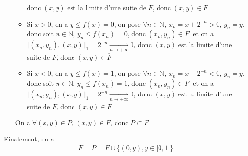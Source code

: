 \documentclass[a4paper,12pt]{book}
\begin{document}
\begin{itemize}
\begin{itemize}
        donc $(x,y)$ est la limite d'une suite de $F$, donc $(x,y) \in \overline{F}$
        \item Si $x>0$, on a $y \leq f(x)=0$, on pose $\forall n \in \mathbb{N}$, $x_n=x+2^{-n}>0$, $y_n=y$, donc soit $n \in \mathbb{N}$, $y_n \leq f(x_n)=0$, donc $(x_n,y_n) \in F$, et on a $\Vert(x_n,y_n),(x,y)\Vert_1=2^{-n}\xrightarrow[n \to +\infty]{}0$, 
        donc $(x,y)$ est la limite d'une suite de $F$, donc $(x,y) \in \overline{F}$
        \item Si $x<0$, on a $y \leq f(x)=1$, on pose $\forall n \in \mathbb{N}$, $x_n=x-2^{-n}<0$, $y_n=y$, donc soit $n \in \mathbb{N}$, $y_n \leq f(x_n)=1$, donc $(x_n,y_n) \in F$, et on a $\Vert(x_n,y_n),(x,y)\Vert_1=2^{-n}\xrightarrow[n \to +\infty]{}0$, 
        donc $(x,y)$ est la limite d'une suite de $F$, donc $(x,y) \in \overline{F}$
    \end{itemize}
    On a $\forall (x,y) \in P$, $(x,y) \in \overline{F}$, donc $P \subset \overline{F}$
\end{itemize}
Finalement, on a 
$$
\boxed{\overline{F}=P=F\cup \{(0,y),y\in ]0,1]\}}
$$
\end{document}
